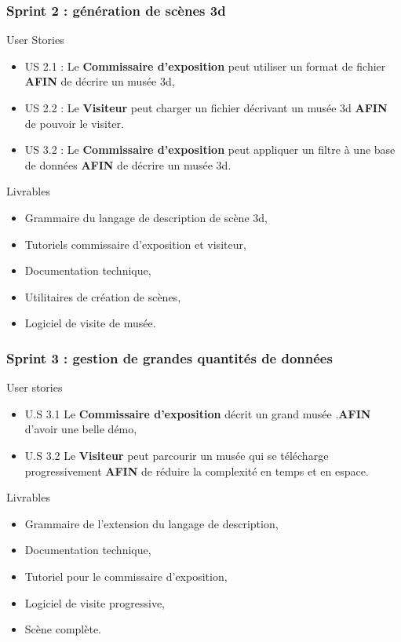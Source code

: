 \documentclass[11pt]{beamer}
\begin{document}
\begin{frame}
\frametitle{Sprint 2 : génération de scènes 3d}
\begin{block}{User Stories}
	\begin{itemize}
		\item 	US 2.1 : Le {\bf Commissaire d'exposition} peut utiliser  un format de fichier {\bf AFIN} de décrire un musée 3d,
		\item 	US 2.2 : Le {\bf Visiteur} peut charger un fichier décrivant un musée 3d   {\bf AFIN} de pouvoir le visiter.
		\item 	US 3.2 : Le {\bf Commissaire d'exposition} peut appliquer un filtre à une base de données {\bf AFIN} de  décrire un musée 3d.
	\end{itemize}
\end{block}

\begin{block}{Livrables}
	\begin{itemize}
		\item Grammaire du langage de description de scène 3d,
		\item Tutoriels commissaire d'exposition et visiteur,
		\item Documentation technique,
		\item Utilitaires de création de scènes,
		\item Logiciel de visite de musée.
	\end{itemize}
\end{block}
\end{frame}

\begin{frame}
\frametitle{Sprint 3 : gestion de grandes quantités de données}
\begin{block}{User stories}
	\begin{itemize}
		\item U.S 3.1 Le {\bf Commissaire d'exposition} décrit un grand musée .{\bf AFIN} d'avoir une belle démo,
		\item U.S 3.2 Le {\bf Visiteur} peut parcourir un musée qui se télécharge progressivement {\bf AFIN} de réduire la complexité en temps et en espace.
	\end{itemize}
\end{block}
\begin{block}{Livrables}
	\begin{itemize}
		\item Grammaire de l'extension du langage de description,
		\item Documentation technique,
		\item Tutoriel pour le commissaire d'exposition,
		\item Logiciel de visite progressive,
		\item Scène complète.
	\end{itemize}
\end{block}
\end{frame}
\end{document}
